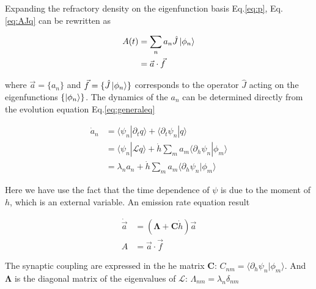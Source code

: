 \documentclass[12pt,twoside]{report}
\begin{document}
Expanding the refractory density on the eigenfunction basis Eq.\eqref{eq:p},  Eq.\eqref{eq:AJq} can be rewritten as

\begin{align}
\label{eq:AJphi}
A(t)&=\sum_n a_n\hat{J}\ket{\phi_n} \nonumber \\
&=\vec{a}\cdot\vec{f}
\end{align}

where $\vec{a}=\{a_n\}$ and $\vec{f}=\{\hat{J}\ket{\phi_n}\}$ corresponds to the operator $\hat{J}$ acting on the eigenfunctions $\{\ket{\phi_n}\}$.
The dynamics of the $a_n$ can be determined directly from the evolution equation Eq.\eqref{eq:generaleq}

\begin{align}
\label{eq:andyn}
\dot{a}_n&=\langle\psi_n|\partial_t q\rangle+\langle\partial_t\psi_n|q\rangle \nonumber \\
&=\langle\psi_n|\mathcal{L}q\rangle+  \dot{h}\sum_ma_m\langle\partial_h\psi_n|\phi_m \rangle \nonumber \\
&=\lambda_n a_n +  \dot{h}\sum_ma_m\langle\partial_h\psi_n|\phi_m \rangle 
\end{align}


Here we have use the fact that the time dependence of $\psi$ is due to the moment of $h$, which is an external variable. An emission rate equation result

\begin{align}
\dot{\vec{a}}&=(\boldsymbol{\Lambda}+\boldsymbol{C}\dot{h})\vec{a}\\
A&=\vec{a}\cdot\vec{f}
\end{align}


The synaptic coupling are expressed in the he matrix $\boldsymbol{C}$: $C_{nm}=\langle\partial_h\psi_n|\phi_m\rangle$. And $\boldsymbol{\Lambda}$ is the diagonal matrix of the eigenvalues of $\mathcal{L}$:  $\Lambda_{nm}=\lambda_n\delta_{nm}$



\end{document}

